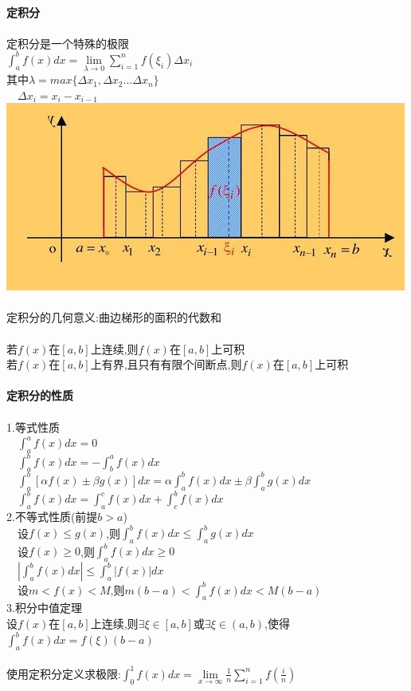 \documentclass{article}
\begin{document}
\begin{flushleft}
	\fontsize{24pt}{30pt}\selectfont
	
	~\\ \textbf{定积分} \\~\\
	
	定积分是一个特殊的极限\\
	$\int_{a}^{b}f(x)dx=\lim\limits_{\lambda\to 0}\sum_{i=1}^{n}f(\xi_i)\Delta x_i$\\
	其中$\lambda = max\{\Delta x_1, \Delta x_2...\Delta x_n\}$\\
	\ \ $\Delta x_i=x_i-x_{i-1}$\\
	\includegraphics[scale=1.0]{2.jpg}\\
	~\\
	定积分的几何意义:曲边梯形的面积的代数和\\
	~\\
	若$f(x)$在$[a,b]$上连续,则$f(x)$在$[a,b]$上可积\\
	若$f(x)$在$[a,b]$上有界,且只有有限个间断点,则$f(x)$在$[a,b]$上可积\\
	
	~\\ \textbf{定积分的性质} \\~\\
	
	1.等式性质\\
	\ \ $\int_{a}^{a}f(x)dx=0$\\
	\ \ $\int_{a}^{b}f(x)dx=-\int_{b}^{a}f(x)dx$\\
	\ \ $\int_{a}^{b}[\alpha f(x)\pm \beta g(x)]dx=\alpha\int_{a}^{b}f(x)dx\pm \beta\int_{a}^{b}g(x)dx$\\
	\ \ $\int_{a}^{b}f(x)dx=\int_{a}^{c}f(x)dx+\int_{c}^{b}f(x)dx$\\
	2.不等式性质(前提$b>a$)\\
	\ \ 设$f(x)\le g(x)$,则$\int_{a}^{b}f(x)dx\le \int_{a}^{b}g(x)dx$\\
	\ \ 设$f(x)\ge 0$,则$\int_{a}^{b}f(x)dx \ge 0$\\
	\ \ $|\int_{a}^{b}f(x)dx| \le \int_{a}^{b}|f(x)|dx$\\
	\ \ 设$m<f(x)<M$,则$m(b-a)<\int_{a}^{b}f(x)dx<M(b-a)$\\
	3.积分中值定理\\
	设$f(x)$在$[a,b]$上连续,则$\exists \xi \in [a,b]$或$\exists \xi \in (a,b)$,使得$\int_{a}^{b}f(x)dx=f(\xi)(b-a)$\\
	~\\
	使用定积分定义求极限:$\int_{0}^{1}f(x)dx=\lim\limits_{x\to \infty}\frac{1}{n}\sum_{i=1}^{n}f(\frac{i}{n})$\\
	

\end{flushleft}
\end{document}
